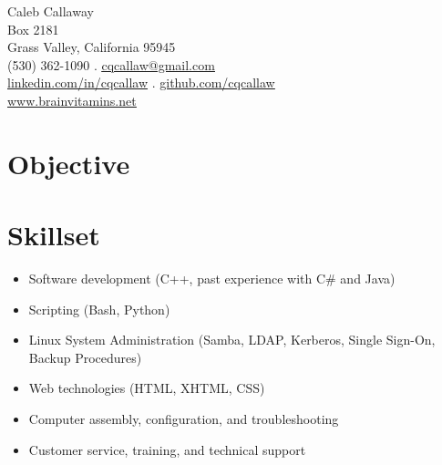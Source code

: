 \documentclass{article}
\begin{document}
	\begin{center}
		{\Large Caleb Callaway}\\
		Box 2181\\
		Grass Valley, California 95945\\
		(530) 362-1090 . \href{mailto:cqcallaw@gmail.com}{\ul{cqcallaw@gmail.com}}\\
		\href{http://linkedin.com/in/cqcallaw/}{\ul{linkedin.com/in/cqcallaw}} . \href{https://github.com/cqcallaw/}{\ul{github.com/cqcallaw}}\\
		\href{https://www.brainvitamins.net/}{\ul{www.brainvitamins.net}}
	\end{center}

	\section*{Objective}

	\section*{Skillset}
	\begin{itemize}[label={}]
		\item Software development (C++, past experience with C\# and Java)
		\item Scripting (Bash, Python)
		\item Linux System Administration (Samba, LDAP, Kerberos, Single Sign-On, Backup Procedures)
		\item Web technologies (HTML, XHTML, CSS)
		\item Computer assembly, configuration, and troubleshooting
		\item Customer service, training, and technical support
	\end{itemize}
\end{document}
